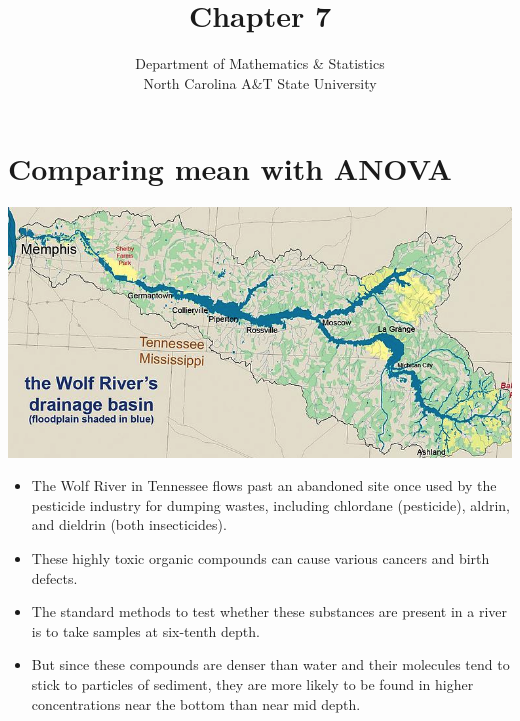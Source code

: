 \documentclass[
  ignorenonframetext,
]{beamer}
\title{Chapter 7}
\subtitle{Inference for numerical data\footnote<.->{These notes use
  content from OpenIntro Statistics Slides by Mine Cetinkaya-Rundel.}}
\author{Department of Mathematics \& Statistics\\
North Carolina A\&T State University}
\date{}
\providecommand{\tightlist}{%
  \setlength{\itemsep}{0pt}\setlength{\parskip}{0pt}}
\begin{document}
\frame{\titlepage}

\hypertarget{comparing-mean-with-anova}{%
\section{Comparing mean with ANOVA}\label{comparing-mean-with-anova}}

\begin{frame}{}
\protect\hypertarget{section}{}
\centering

\includegraphics[width=\textwidth,height=0.25\textheight]{images/wolf.png}

\begin{itemize}
\tightlist
\item
  The Wolf River in Tennessee flows past an abandoned site once used by
  the pesticide industry for dumping wastes, including chlordane
  (pesticide), aldrin, and dieldrin (both insecticides).
\end{itemize}

\pause

\begin{itemize}
\tightlist
\item
  These highly toxic organic compounds can cause various cancers and
  birth defects.
\end{itemize}

\pause

\begin{itemize}
\tightlist
\item
  The standard methods to test whether these substances are present in a
  river is to take samples at six-tenth depth.
\end{itemize}

\pause

\begin{itemize}
\tightlist
\item
  But since these compounds are denser than water and their molecules
  tend to stick to particles of sediment, they are more likely to be
  found in higher concentrations near the bottom than near mid depth.
\end{itemize}
\end{frame}
\end{document}
